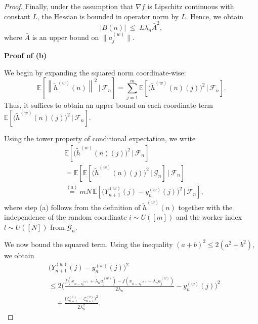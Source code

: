 \documentclass{article}
\newcommand{\norm}[1]{\left\lVert #1 \right\rVert}
\begin{document}
\begin{proof}
Finally, under the assumption that $\nabla f$ is Lipschitz continuous with constant $L$, the Hessian is bounded in operator norm by $L$. Hence, we obtain
\[
|B(n)| \;\leq\; L \lambda_n \bar{A}^2,
\]
where $\bar{A}$ is an upper bound on $\|a_j^{(w)}\|$.


\textbf{Proof of (b)}

We begin by expanding the squared norm coordinate-wise:
\begin{equation*}
\mathbb{E}\!\left[\norm{\widetilde{h}^{(w)} (n)}^2 \,\big|\, \mathcal{F}_n \right] 
= \sum_{j=1}^{m} 
\mathbb{E}\!\left[ \big(\widetilde{h}^{(w)} (n)(j)\big)^2 \,\big|\, \mathcal{F}_n \right].
\end{equation*}
Thus, it suffices to obtain an upper bound on each coordinate term 
\(\mathbb{E}\!\left[\big(\widetilde{h}^{(w)} (n)(j)\big)^2 \,\big|\, \mathcal{F}_n \right]\).

Using the tower property of conditional expectation, we write
\begin{equation}
\begin{split}
&\mathbb{E}\!\left[\big(\widetilde{h}^{(w)}(n)(j)\big)^2 \,\big|\, \mathcal{F}_n \right] \\
&= \mathbb{E}\!\left[
    \mathbb{E}\!\left[\big(\widetilde{h}^{(w)}(n)(j)\big)^2 \,\big|\, \mathcal{G}_n \right]
    \,\Big|\, \mathcal{F}_n
\right] \\
&\overset{(a)}{=}
m N \, \mathbb{E}\!\left[
    \big(Y_{n+1}^{(w)}(j) - y_n^{(w)}(j)\big)^2 
    \,\big|\, \mathcal{F}_n
\right],
\end{split}
\label{b prof}
\end{equation}
where step (a) follows from the definition of $\widetilde{h}^{(w)}(n)$ together with the independence of the random coordinate $i \sim U([m])$ and the worker index $l \sim U([N])$ from $\mathcal{G}_n$.

We now bound the squared term. Using the inequality $(a+b)^2 \leq 2(a^2 + b^2)$, we obtain
\begin{equation*}
\begin{split}
&\big(Y_{n+1}^{(w)}(j) - y_n^{(w)}(j)\big)^2 \\
&\leq 
2 \Bigg(
\frac{
f\!\left(x_{n-\tau_n^{(w)}} + \lambda_n a_j^{(w)}\right)
- f\!\left(x_{n-\tau_n^{(w)}} - \lambda_n a_j^{(w)}\right)
}{2\lambda_n}
- y_n^{(w)}(j)
\Bigg)^2 \\
&\quad + \frac{\big(\zeta_{n+1}^{(1)} - \zeta_{n+1}^{(2)}\big)^2}{2\lambda_n^2}.
\end{split}
\end{equation*}


\end{proof}
\end{document}
